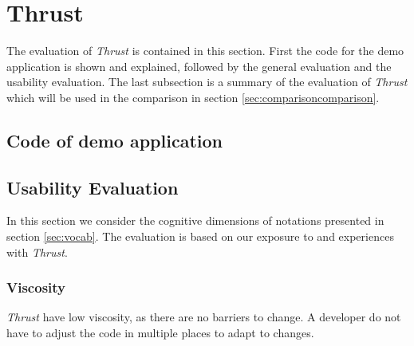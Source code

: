 \section{Thrust}
The evaluation of \textit{Thrust} is contained in this section. First the code for the demo application is shown and explained, followed by the general evaluation and the usability evaluation. The last subsection is a summary of the evaluation of \textit{Thrust} which will be used in the comparison in section \ref{sec:comparisoncomparison}.

\subsection{Code of demo application}





\subsection{Usability Evaluation}
In this section we consider the cognitive dimensions of notations presented in section \ref{sec:vocab}. The evaluation is based on our exposure to and experiences with \textit{Thrust}.

\subsubsection[*]{Viscosity}
\textit{Thrust} have low viscosity, as there are no barriers to change. A developer do not have to adjust the code in multiple places to adapt to changes. 

